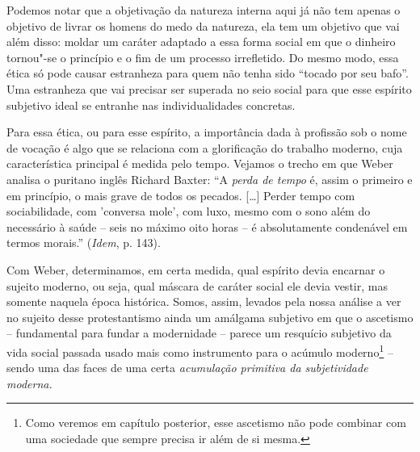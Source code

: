 Podemos notar que a objetivação da natureza interna aqui já não tem
apenas o objetivo de livrar os homens do medo da natureza, ela tem um
objetivo que vai além disso: moldar um caráter adaptado a essa forma
social em que o dinheiro tornou"-se o princípio e o fim de um processo
irrefletido. Do mesmo modo, essa ética só pode causar estranheza para
quem não tenha sido ``tocado por seu bafo''. Uma estranheza que vai
precisar ser superada no seio social para que esse espírito subjetivo
ideal se entranhe nas individualidades concretas.

Para essa ética, ou para esse espírito, a importância dada à profissão
sob o nome de vocação é algo que se relaciona com a glorificação do
trabalho moderno, cuja característica principal é medida pelo tempo.
Vejamos o trecho em que Weber analisa o puritano inglês Richard Baxter:
``A \emph{perda de tempo} é, assim o primeiro e em princípio, o mais
grave de todos os pecados. [\ldots{}] Perder tempo com
sociabilidade, com 'conversa mole', com luxo, mesmo com o sono além do
necessário à saúde -- seis no máximo oito horas -- é absolutamente
condenável em termos morais.'' (\emph{Idem}, p. 143).

Com Weber, determinamos, em certa medida, qual espírito devia encarnar o
sujeito moderno, ou seja, qual máscara de caráter social ele devia
vestir, mas somente naquela época histórica. Somos, assim, levados pela
nossa análise a ver no sujeito desse protestantismo ainda um amálgama
subjetivo em que o ascetismo -- fundamental para fundar a modernidade --
parece um resquício subjetivo da vida social passada usado mais como
instrumento para o acúmulo moderno\footnote{Como veremos em capítulo
  posterior, esse ascetismo não pode combinar com uma sociedade que
  sempre precisa ir além de si mesma.} -- sendo uma das faces de uma
certa \emph{acumulação primitiva da subjetividade moderna.}

